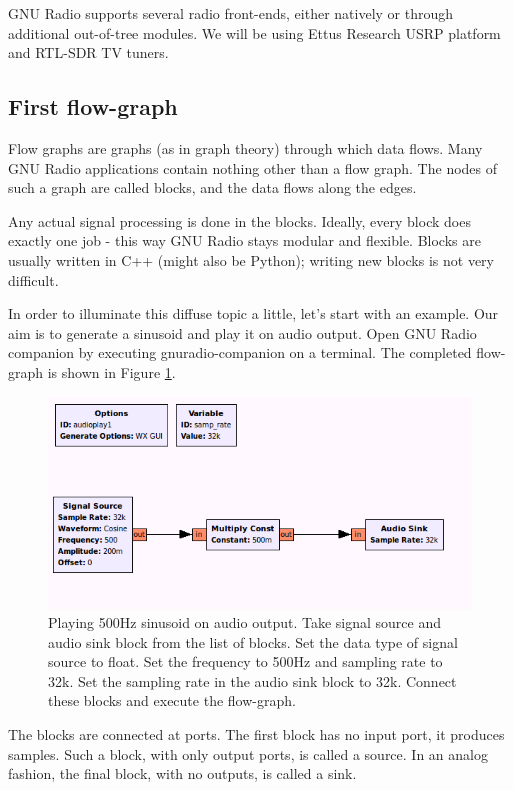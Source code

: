\documentclass[a4paper,10pt]{article}
\begin{document}
GNU Radio supports several radio front-ends, either natively or through additional out-of-tree modules.
We will be using Ettus Research USRP platform and RTL-SDR TV tuners.

\subsection{First flow-graph}
Flow graphs are graphs (as in graph theory) through which data flows.
Many GNU Radio applications contain nothing other than a flow graph.
The nodes of such a graph are called blocks, and the data flows along the edges.

Any actual signal processing is done in the blocks.
Ideally, every block does exactly one job - this way GNU Radio stays modular and flexible.
Blocks are usually written in C++ (might also be Python); writing new blocks is not very difficult.

In order to illuminate this diffuse topic a little, let's start with an example.
Our aim is to generate a sinusoid and play it on audio output.
Open GNU Radio companion by executing gnuradio-companion on a terminal. 
The completed flow-graph is shown in Figure \ref{fig:audio-play1}.
\begin{figure}
\centering
 \includegraphics[scale=0.40]{figures/audio-play1.png}
 \caption{Playing 500Hz sinusoid on audio output.
 Take signal source and audio sink block from the list of blocks.
 Set the data type of signal source to float.
 Set the frequency to 500Hz and sampling rate to 32k.
 Set the sampling rate in the audio sink block to 32k.
 Connect these blocks and execute the flow-graph.\label{fig:audio-play1}}
\end{figure}

The blocks are connected at ports. 
The first block has no input port, it produces samples. 
Such a block, with only output ports, is called a source. 
In an analog fashion, the final block, with no outputs, is called a sink.
\end{document}
